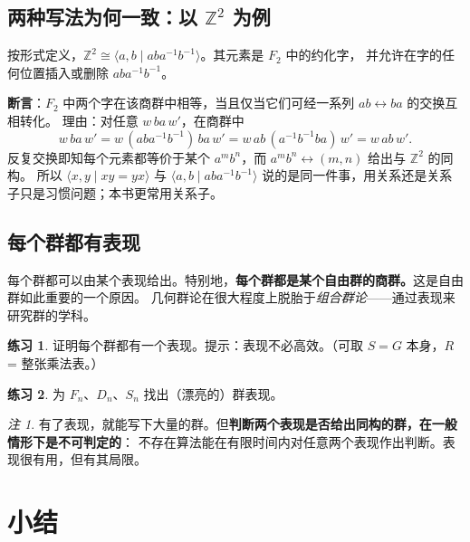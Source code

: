 \documentclass[11pt,a4paper]{article}
\theoremstyle{definition}
\newtheorem{exercise}{练习}
\theoremstyle{plain}
\theoremstyle{remark}
\newtheorem*{remark}{注}
\newcommand{\Z}{\mathbb{Z}}
\begin{document}
\subsection{两种写法为何一致：以 $\Z^2$ 为例}

按形式定义，$\Z^2\cong\langle a,b\mid aba^{-1}b^{-1}\rangle$。其元素是 $F_2$ 中的约化字，
并允许在字的任何位置插入或删除 $aba^{-1}b^{-1}$。

\textbf{断言}：$F_2$ 中两个字在该商群中相等，当且仅当它们可经一系列 $ab\leftrightarrow ba$ 的交换互相转化。
理由：对任意 $w\,ba\,w'$，在商群中
\[
  w\,ba\,w' = w\,(aba^{-1}b^{-1})\,ba\,w' = w\,ab\,(a^{-1}b^{-1}ba)\,w' = w\,ab\,w' .
\]
反复交换即知每个元素都等价于某个 $a^mb^n$，而 $a^mb^n\leftrightarrow(m,n)$ 给出与 $\Z^2$ 的同构。
所以 $\langle x,y\mid xy=yx\rangle$ 与 $\langle a,b\mid aba^{-1}b^{-1}\rangle$ 说的是同一件事，用关系还是关系子只是习惯问题；本书更常用关系子。

\subsection{每个群都有表现}

\begin{keyidea}[核心事实]
每个群都可以由某个表现给出。特别地，\textbf{每个群都是某个自由群的商群。}这是自由群如此重要的一个原因。
几何群论在很大程度上脱胎于\emph{组合群论}——通过表现来研究群的学科。
\end{keyidea}

\begin{exercise}
证明每个群都有一个表现。提示：表现不必高效。（可取 $S=G$ 本身，$R$ = 整张乘法表。）
\end{exercise}
\begin{exercise}
为 $F_n$、$D_n$、$S_n$ 找出（漂亮的）群表现。
\end{exercise}

\begin{remark}
有了表现，就能写下大量的群。但\textbf{判断两个表现是否给出同构的群，在一般情形下是不可判定的}：
不存在算法能在有限时间内对任意两个表现作出判断。表现很有用，但有其局限。
\end{remark}

\section*{小结}
\end{document}
